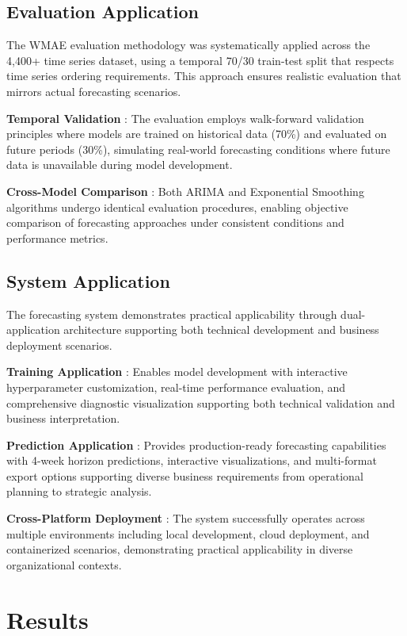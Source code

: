 \subsection{Evaluation Application}

The WMAE evaluation methodology was systematically applied across the 4,400+ time series dataset, using a temporal 70/30 train-test split that respects time series ordering requirements. This approach ensures realistic evaluation that mirrors actual forecasting scenarios.

\textbf{Temporal Validation }: The evaluation employs walk-forward validation principles where models are trained on historical data (70\%) and evaluated on future periods (30\%), simulating real-world forecasting conditions where future data is unavailable during model development.

\textbf{Cross-Model Comparison }: Both ARIMA and Exponential Smoothing algorithms undergo identical evaluation procedures, enabling objective comparison of forecasting approaches under consistent conditions and performance metrics.

\subsection{System Application}

The forecasting system demonstrates practical applicability through dual-application architecture supporting both technical development and business deployment scenarios.

\textbf{Training Application }: Enables model development with interactive hyperparameter customization, real-time performance evaluation, and comprehensive diagnostic visualization supporting both technical validation and business interpretation.

\textbf{Prediction Application }: Provides production-ready forecasting capabilities with 4-week horizon predictions, interactive visualizations, and multi-format export options supporting diverse business requirements from operational planning to strategic analysis.

\textbf{Cross-Platform Deployment }: The system successfully operates across multiple environments including local development, cloud deployment, and containerized scenarios, demonstrating practical applicability in diverse organizational contexts.

\section{Results}

